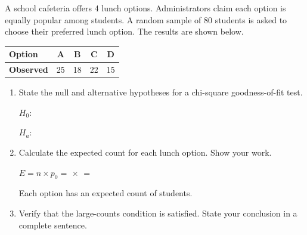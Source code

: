 \documentclass[10pt]{article}
\begin{document}
\namedateperiod

\vspace{0.15in}

A school cafeteria offers 4 lunch options. Administrators claim each option is equally
popular among students. A random sample of 80 students is asked to choose their
preferred lunch option. The results are shown below.

\renewcommand{\arraystretch}{1.5}
\begin{center}
\begin{tabular}{lcccc}
    \textbf{Option}   & A  & B  & C  & D  \\
    \hline
    \textbf{Observed} & 25 & 18 & 22 & 15 \\
\end{tabular}
\end{center}

\vspace{0.1in}

\begin{enumerate}

  \item State the null and alternative hypotheses for a chi-square goodness-of-fit test.

        \vspace{0.1in}
        $H_0$: \blank{10cm}

        \vspace{0.15in}
        $H_a$: \blank{10cm}

        \vspace{0.1in}

  \item Calculate the expected count for each lunch option. Show your work.

        \vspace{0.08in}
        $E = n \times p_0 =$ \blank{2.5cm} $\times$ \blank{2.5cm} $=$ \blank{2cm}

        \vspace{0.1in}
        Each option has an expected count of \blank{2cm} students.

        \vspace{0.1in}

  \item Verify that the large-counts condition is satisfied. State your conclusion in a
        complete sentence.


\end{enumerate}
\end{document}
